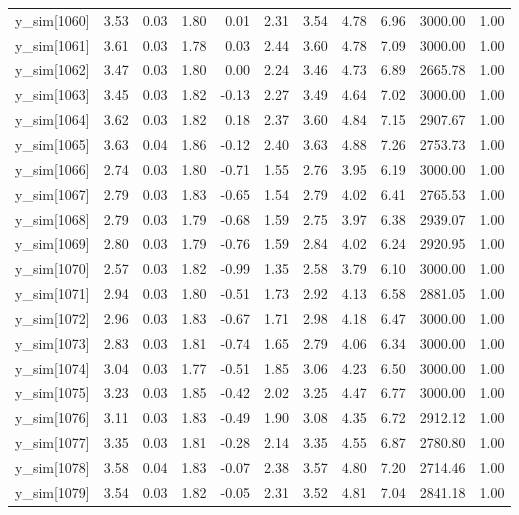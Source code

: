 \begin{table}[ht]
\begin{tabular}{rrrrrrrrrrr}
  y\_sim[1060] & 3.53 & 0.03 & 1.80 & 0.01 & 2.31 & 3.54 & 4.78 & 6.96 & 3000.00 & 1.00 \\ 
  y\_sim[1061] & 3.61 & 0.03 & 1.78 & 0.03 & 2.44 & 3.60 & 4.78 & 7.09 & 3000.00 & 1.00 \\ 
  y\_sim[1062] & 3.47 & 0.03 & 1.80 & 0.00 & 2.24 & 3.46 & 4.73 & 6.89 & 2665.78 & 1.00 \\ 
  y\_sim[1063] & 3.45 & 0.03 & 1.82 & -0.13 & 2.27 & 3.49 & 4.64 & 7.02 & 3000.00 & 1.00 \\ 
  y\_sim[1064] & 3.62 & 0.03 & 1.82 & 0.18 & 2.37 & 3.60 & 4.84 & 7.15 & 2907.67 & 1.00 \\ 
  y\_sim[1065] & 3.63 & 0.04 & 1.86 & -0.12 & 2.40 & 3.63 & 4.88 & 7.26 & 2753.73 & 1.00 \\ 
  y\_sim[1066] & 2.74 & 0.03 & 1.80 & -0.71 & 1.55 & 2.76 & 3.95 & 6.19 & 3000.00 & 1.00 \\ 
  y\_sim[1067] & 2.79 & 0.03 & 1.83 & -0.65 & 1.54 & 2.79 & 4.02 & 6.41 & 2765.53 & 1.00 \\ 
  y\_sim[1068] & 2.79 & 0.03 & 1.79 & -0.68 & 1.59 & 2.75 & 3.97 & 6.38 & 2939.07 & 1.00 \\ 
  y\_sim[1069] & 2.80 & 0.03 & 1.79 & -0.76 & 1.59 & 2.84 & 4.02 & 6.24 & 2920.95 & 1.00 \\ 
  y\_sim[1070] & 2.57 & 0.03 & 1.82 & -0.99 & 1.35 & 2.58 & 3.79 & 6.10 & 3000.00 & 1.00 \\ 
  y\_sim[1071] & 2.94 & 0.03 & 1.80 & -0.51 & 1.73 & 2.92 & 4.13 & 6.58 & 2881.05 & 1.00 \\ 
  y\_sim[1072] & 2.96 & 0.03 & 1.83 & -0.67 & 1.71 & 2.98 & 4.18 & 6.47 & 3000.00 & 1.00 \\ 
  y\_sim[1073] & 2.83 & 0.03 & 1.81 & -0.74 & 1.65 & 2.79 & 4.06 & 6.34 & 3000.00 & 1.00 \\ 
  y\_sim[1074] & 3.04 & 0.03 & 1.77 & -0.51 & 1.85 & 3.06 & 4.23 & 6.50 & 3000.00 & 1.00 \\ 
  y\_sim[1075] & 3.23 & 0.03 & 1.85 & -0.42 & 2.02 & 3.25 & 4.47 & 6.77 & 3000.00 & 1.00 \\ 
  y\_sim[1076] & 3.11 & 0.03 & 1.83 & -0.49 & 1.90 & 3.08 & 4.35 & 6.72 & 2912.12 & 1.00 \\ 
  y\_sim[1077] & 3.35 & 0.03 & 1.81 & -0.28 & 2.14 & 3.35 & 4.55 & 6.87 & 2780.80 & 1.00 \\ 
  y\_sim[1078] & 3.58 & 0.04 & 1.83 & -0.07 & 2.38 & 3.57 & 4.80 & 7.20 & 2714.46 & 1.00 \\ 
  y\_sim[1079] & 3.54 & 0.03 & 1.82 & -0.05 & 2.31 & 3.52 & 4.81 & 7.04 & 2841.18 & 1.00 \\ 

\end{tabular}
\end{table}
